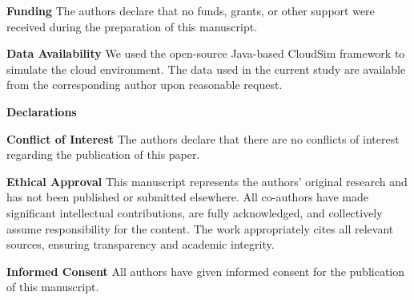 \documentclass[pdflatex,sn-mathphys-num]{sn-jnl}%
\begin{document}
\textbf{Funding} The authors declare that no funds, grants, or other support were received during the preparation of this manuscript.

\textbf{Data Availability} We used the open-source Java-based CloudSim framework to simulate the cloud environment. The data used in the current study are available from the corresponding author upon reasonable request.

\textbf{Declarations}

\textbf{Conflict of Interest} The authors declare that there are no conflicts of interest regarding the publication of this paper.

\textbf{Ethical Approval} This manuscript represents the authors’ original research and has not been published or submitted elsewhere. All co-authors have made significant intellectual contributions, are fully acknowledged, and collectively assume responsibility for the content. The work appropriately cites all relevant sources, ensuring transparency and academic integrity.

\textbf{Informed Consent} All authors have given informed consent for the publication of this manuscript.


\end{document}
